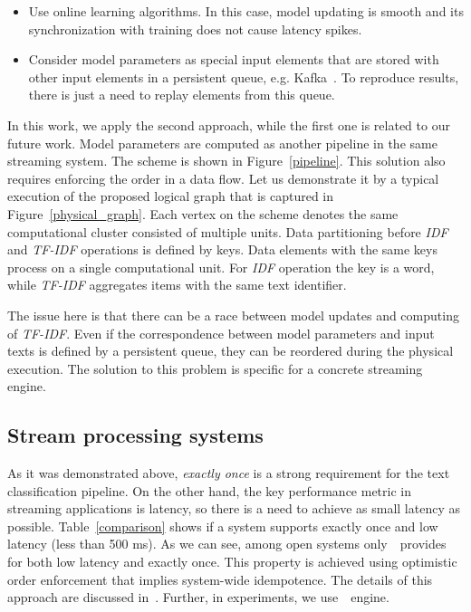 \begin{itemize}
    \item Use online learning algorithms. In this case, model updating is smooth and its synchronization with training does not cause latency spikes.
    \item Consider model parameters as special input elements that are stored with other input elements in a persistent queue, e.g. Kafka~\cite{kreps2011kafka}. To reproduce results, there is just a need to replay elements from this queue.
\end{itemize}

In this work, we apply the second approach, while the first one is related to our future work. Model parameters are computed as another pipeline in the same streaming system. The scheme is shown in Figure~\ref{pipeline}. This solution also requires enforcing the order in a data flow. Let us demonstrate it by a typical execution of the proposed logical graph that is captured in Figure~\ref{physical_graph}. Each vertex on the scheme denotes the same computational cluster consisted of multiple units. Data partitioning before {\em IDF} and {\em TF-IDF} operations is defined by keys. Data elements with the same keys process on a single computational unit. For {\em IDF} operation the key is a word, while {\em TF-IDF} aggregates items with the same text identifier. 

The issue here is that there can be a race between model updates and computing of {\em TF-IDF}. Even if the correspondence between model parameters and input texts is defined by a persistent queue, they can be reordered during the physical execution. The solution to this problem is specific for a concrete streaming engine.

\subsection{Stream processing systems}

As it was demonstrated above, {\em exactly once} is a strong requirement for the text classification pipeline. On the other hand, the key performance metric in streaming applications is latency, so there is a need to achieve as small latency as possible. Table~\ref{comparison} shows if a system supports exactly once and low latency (less than 500 ms). As we can see, among open systems only~\FlameStream\ provides for both low latency and exactly once. This property is achieved using optimistic order enforcement that implies system-wide idempotence. The details of this approach are discussed in~\cite{we2018adbis, we2018beyondmr}. Further, in experiments, we use~\FlameStream\ engine.

